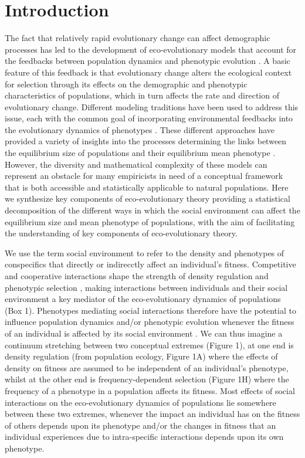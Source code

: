 \documentclass{article}
\begin{document}
\newpage
\section{Introduction}
 The fact that relatively rapid evolutionary change can affect demographic processes has led to the development of eco-evolutionary models that account for the feedbacks between population dynamics and phenotypic evolution \cite[reviewed by][]{Pelletier2009, Hendry2018, Govaert2019}. A basic feature of this feedback is that evolutionary change alters the ecological context for selection through its effects on the demographic and phenotypic characteristics of populations, which in turn affects the rate and direction of evolutionary change. Different modeling traditions have been used to address this issue, each with the common goal of incorporating environmental feedbacks into the evolutionary dynamics of phenotypes \citep{Heino1998, Lion2018}. These different approaches have provided a variety of insights into the processes determining the links between the equilibrium size of populations and their equilibrium mean phenotype \citep{MacArthur1962, Boyce1984, Charlesworth1994, Abrams1993, Mylius1995, Lande2009a, Engen2020}. However, the diversity and mathematical complexity of these models can represent an obstacle for many empiricists in need of a conceptual framework that is both accessible and statistically applicable to natural populations. Here we synthesize key components of eco-evolutionary theory providing a statistical decomposition of the different ways in which the social environment can affect the equilibrium size and mean phenotype of populations, with the aim of facilitating the understanding of key components of eco-evolutionary theory. 
 
 We use the term social environment to refer to the density and phenotypes of conspecifics that directly or indirecctly affect an individual's fitness. Competitive and cooperative interactions shape the strength of density regulation and phenotypic selection \citep{Lack1954, Haldane1956, West-Eberhard1979, frank1998foundations}, making interactions between individuals and their social environment a key mediator of the eco-evolutionary dynamics of populations (Box 1). Phenotypes mediating social interactions therefore have the potential to influence population dynamics and/or phenotypic evolution whenever the fitness of an individual is affected by its social environment \citep{Wolf1999SocialSelection, Travis2013}. We can thus imagine a continuum stretching between two conceptual extremes (Figure 1), at one end is density regulation (from population ecology, Figure 1A) where the effects of density on fitness are assumed to be independent of an individual's phenotype, whilst at the other end is frequency-dependent selection (Figure 1H) where the frequency of a phenotype in a population affects its fitness. Most effects of social interactions on the eco-evolutionary dynamics of populations lie somewhere between these two extremes, whenever the impact an individual has on the fitness of others depends upon its phenotype and/or the changes in fitness that an individual experiences due to intra-specific interactions depends upon its own phenotype. 
 
\end{document}

